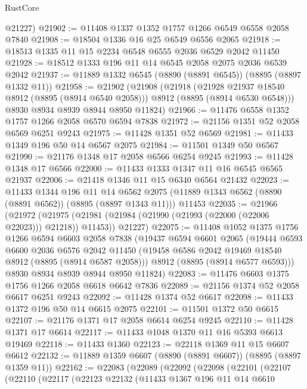 \begin{lexlean}{RustCore}
\begin{coremodule}
      @21227)
@21902 := @11408 @1337 @1352 @1757 @1266 @6549 @6558 @2058 @7840
@21908 := @18504 @1336 @16 @25 @6549 @6556 @2065
@21918 := @18513 @1335 @11 @15 @2234 @6548 @6555 @2036 @6529 @2042 @11450
@21928 := @18512 @1333 @196 @11 @14 @6545 @2058 @2075 @2036 @6539 @2042
@21937 := @11889 @1332 @6545 (@8890 (@8891 @6545)) (@8895 (@8897 @1332 @11))
@21958 := @21902
    (@21908
      (@21918
        (@21928 @21937 @18540 @8912 (@8895 (@8914 @6540 @2058)))
        @8912
        (@8895 (@8914 @6530 @6548)))
      @8930
      @8934
      @8939
      @8944
      @8950
      @11824)
@21966 := @11476 @6558 @1352 @1757 @1266 @2058 @6570 @6594 @7838
@21972 := @21156 @1351 @52 @2058 @6569 @6251 @9243
@21975 := @11428 @1351 @52 @6569
@21981 := @11433 @1349 @196 @50 @14 @6567 @2075
@21984 := @11501 @1349 @50 @6567
@21990 := @21176 @1348 @17 @2058 @6566 @6254 @9245
@21993 := @11428 @1348 @17 @6566
@22000 := @11433 @1333 @1347 @11 @16 @6545 @6565 @21937
@22006 := @21418 @1346 @11 @15 @6340 @6564 @21432
@22023 := @11433
    @1344
    @196
    @11
    @14
    @6562
    @2075
    (@11889 @1343 @6562 (@8890 (@8891 @6562)) (@8895 (@8897 @1343 @11)))
    @11453
@22035 := @21966
    (@21972
      (@21975 (@21981 (@21984 (@21990 (@21993 (@22000 (@22006 @22023))) @21218)) @11453))
      @21227)
@22075 := @11408
    @1052
    @1375
    @1756
    @1266
    @6594
    @6603
    @2058
    @7838
    (@19437
      @6594
      @6601
      @2065
      (@19444
        @6593
        @6600
        @2036
        @6576
        @2042
        @11450
        (@19458 @6586 @2042 @19469 @18540 @8912 (@8895 (@8914 @6587 @2058)))
        @8912
        (@8895 (@8914 @6577 @6593)))
      @8930
      @8934
      @8939
      @8944
      @8950
      @11824)
@22083 := @11476 @6603 @1375 @1756 @1266 @2058 @6618 @6642 @7836
@22089 := @21156 @1374 @52 @2058 @6617 @6251 @9243
@22092 := @11428 @1374 @52 @6617
@22098 := @11433 @1372 @196 @50 @14 @6615 @2075
@22101 := @11501 @1372 @50 @6615
@22107 := @21176 @1371 @17 @2058 @6614 @6254 @9245
@22110 := @11428 @1371 @17 @6614
@22117 := @11433 @1048 @1370 @11 @16 @5393 @6613 @19469
@22118 := @11433 @1360
@22123 := @22118 @1369 @11 @15 @6607 @6612
@22132 := @11889 @1359 @6607 (@8890 (@8891 @6607)) (@8895 (@8897 @1359 @11))
@22162 := @22083
    (@22089
      (@22092
        (@22098
          (@22101
            (@22107
              (@22110
                (@22117
                  (@22123
                    @22132
                    (@11433
                      @1367
                      @196
                      @11
                      @14
                      @6610

\end{coremodule}
\end{lexlean}
